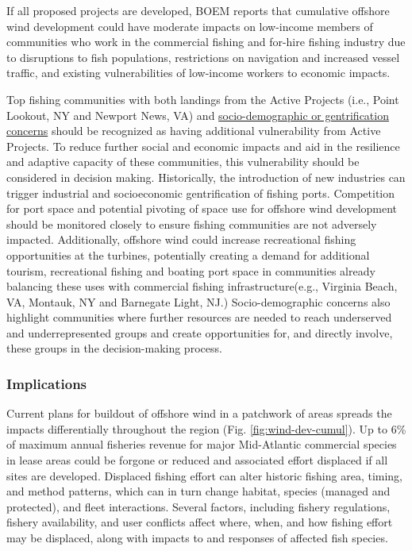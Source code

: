 \documentclass[
  10pt,
]{article}
\begin{document}
If all proposed projects are developed, BOEM reports that cumulative offshore wind development could have moderate impacts on low-income members of communities who work in the commercial fishing and for-hire fishing industry due to disruptions to fish populations, restrictions on navigation and increased vessel traffic, and existing vulnerabilities of low-income workers to economic impacts.

Top fishing communities with both landings from the Active Projects (i.e., Point Lookout, NY and Newport News, VA) and \href{https://noaa-edab.github.io/catalog/engagement.html}{socio-demographic or gentrification concerns} should be recognized as having additional vulnerability from Active Projects. To reduce further social and economic impacts and aid in the resilience and adaptive capacity of these communities, this vulnerability should be considered in decision making. Historically, the introduction of new industries can trigger industrial and socioeconomic gentrification of fishing ports. Competition for port space and potential pivoting of space use for offshore wind development should be monitored closely to ensure fishing communities are not adversely impacted. Additionally, offshore wind could increase recreational fishing opportunities at the turbines, potentially creating a demand for additional tourism, recreational fishing and boating port space in communities already balancing these uses with commercial fishing infrastructure(e.g., Virginia Beach, VA, Montauk, NY and Barnegate Light, NJ.) Socio-demographic concerns also highlight communities where further resources are needed to reach underserved and underrepresented groups and create opportunities for, and directly involve, these groups in the decision-making process.

\subsubsection{Implications}\label{implications-6}

Current plans for buildout of offshore wind in a patchwork of areas spreads the impacts differentially throughout the region (Fig. \ref{fig:wind-dev-cumul}). Up to 6\% of maximum annual fisheries revenue for major Mid-Atlantic commercial species in lease areas could be forgone or reduced and associated effort displaced if all sites are developed. Displaced fishing effort can alter historic fishing area, timing, and method patterns, which can in turn change habitat, species (managed and protected), and fleet interactions. Several factors, including fishery regulations, fishery availability, and user conflicts affect where, when, and how fishing effort may be displaced, along with impacts to and responses of affected fish species.
\end{document}
